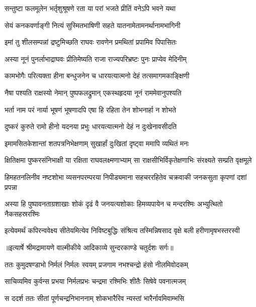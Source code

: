 \twolineshloka
{सन्तुष्टा फलमूलेन भर्तृशुश्रूषणे रता}
{या परां भजते प्रीतिं वनेऽपि भवने यथा} %

\twolineshloka
{सेयं कनकवर्णाङ्गी नित्यं सुस्मितभाषिणी}
{सहते यातनामेतामनर्थानामभागिनी} %

\twolineshloka
{इमां तु शीलसम्पन्नां द्रष्टुमिच्छति राघवः}
{रावणेन प्रमथितां प्रपामिव पिपासितः} %

\twolineshloka
{अस्या नूनं पुनर्लाभाद्राघवः प्रीतिमेष्यति}
{राजा राज्यपरिभ्रष्टः पुनः प्राप्येव मेदिनीम्} %

\twolineshloka
{कामभोगैः परित्यक्ता हीना बन्धुजनेन च}
{धारयत्यात्मनो देहं तत्समागमकाङ्क्षिणी} %

\twolineshloka
{नैषा पश्यति राक्षस्यो नेमान् पुष्पफलद्रुमान्}
{एकस्थहृदया नूनं राममेवानुपश्यति} %

\twolineshloka
{भर्ता नाम परं नार्या भूषणं भूषणादपि}
{एषा हि रहिता तेन शोभनार्हा न शोभते} %

\twolineshloka
{दुष्करं कुरुते रामो हीनो यदनया प्रभुः}
{धारयत्यात्मनो देहं न दुःखेनावसीदति} %

\twolineshloka
{इमामसितकेशान्तां शतपत्रनिभेक्षणाम्}
{सुखार्हां दुःखितां दृष्ट्वा ममापि व्यथितं मनः} %

\fourlineindentedshloka
{क्षितिक्षमा पुष्करसंनिभाक्षी}
{या रक्षिता राघवलक्ष्मणाभ्याम्}
{सा राक्षसीभिर्विकृतेक्षणाभिः}
{संरक्ष्यते सम्प्रति वृक्षमूले} %

\fourlineindentedshloka
{हिमहतनलिनीव नष्टशोभा}
{व्यसनपरम्परया निपीड्यमाना}
{सहचररहितेव चक्रवाकी}
{जनकसुता कृपणां दशां प्रपन्ना} %

\fourlineindentedshloka
{अस्या हि पुष्पावनताग्रशाखाः}
{शोकं दृढं वै जनयत्यशोकाः}
{हिमव्यपायेन च मन्दरश्मिः}
{अभ्युत्थितो नैकसहस्ररश्मिः} %

\fourlineindentedshloka
{इत्येवमर्थं कपिरन्ववेक्ष्य}
{सीतेयमित्येव निविष्टबुद्धिः}
{संश्रित्य तस्मिन्निषसाद वृक्षे}
{बली हरीणामृषभस्तरस्वी} %


{॥इत्यार्षे श्रीमद्रामायणे वाल्मीकीये आदिकाव्ये सुन्दरकाण्डे चतुर्दशः सर्गः॥}


\twolineshloka
{ततः कुमुदषण्डाभो निर्मलं निर्मलः स्वयम्}
{प्रजगाम नभश्चन्द्रो हंसो नीलमिवोदकम्} %

\twolineshloka
{साचिव्यमिव कुर्वन्स प्रभया निर्मलप्रभः}
{चन्द्रमा रश्मिभिः शीतैः सिषेवे पवनात्मजम्} %

\twolineshloka
{स ददर्श ततः सीतां पूर्णचन्द्रनिभाननाम्}
{शोकभारैरिव न्यस्तां भारैर्नावमिवाम्भसि} %

